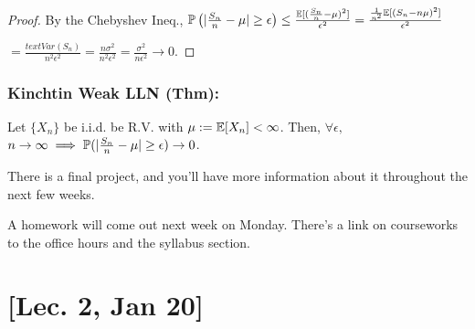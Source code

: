 \begin{proof}
By the Chebyshev Ineq., $\mathbb{P}\left( |\frac{S_n}{n} - \mu| \geq \epsilon \right)
	\leq \frac{\mathbb{E}[(\frac{S_n}{n} - \mu)^2] }{ \epsilon^2 }
= \frac{  \frac{1}{n^2} \mathbb{E}[(S_n - n\mu)^2] }{ \epsilon^2 } $

$= \frac{text{Var} (S_n) }{ n^2\epsilon^2 } = \frac{n\sigma^2}{ n^2\epsilon^2} = \frac{\sigma^2}{n\epsilon^2} \to 0$.
\end{proof}

\subsubsection*{Kinchtin Weak LLN (Thm):} Let $\{ X_n\}$ be i.i.d. be R.V. with $\mu := \mathbb{E}[X_n] < \infty$. Then, $\forall \epsilon,$ $n\to \infty \implies \mathbb{P}(|\frac{S_n}{n} - \mu| \geq \epsilon) \to 0$.



\begin{note}
There is a final project, and you'll have more information about it throughout the next few weeks.

A homework will come out next week on Monday. There's a link on courseworks to the office hours and the syllabus section.
\end{note}

\section{[Lec. 2, Jan 20]}



